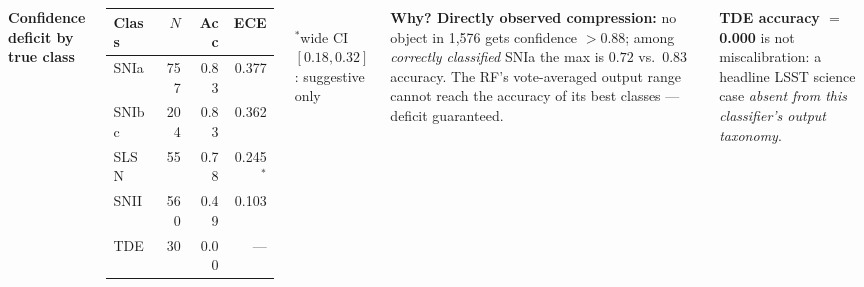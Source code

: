 \documentclass[20pt, a1paper, landscape, margin=0mm, innermargin=12mm, blockverticalspace=7mm, colspace=14mm, subcolspace=8mm]{tikzposter}
\begin{document}
\begin{columns}
{\vspace{4mm}
\begin{minipage}[t]{0.46\linewidth}
\centering
\textbf{Confidence deficit by true class}\\[2mm]
\begin{tabular}{lrrr}
\toprule
Class & $N$ & Acc & ECE \\
\midrule
SNIa  & 757 & 0.83 & \textcolor{posterbad}{0.377} \\
SNIbc & 204 & 0.83 & \textcolor{posterbad}{0.362} \\
SLSN  &  55 & 0.78 & 0.245$^{*}$ \\
SNII  & 560 & 0.49 & \textcolor{postergood}{0.103} \\
TDE   &  30 & \textcolor{posterbad}{0.00} & — \\
\bottomrule
\end{tabular}\\[2mm]
{\small $^{*}$wide CI $[0.18, 0.32]$: suggestive only}
\end{minipage}%
\hfill
\begin{minipage}[t]{0.50\linewidth}
\textbf{Why? Directly observed compression:} no object in 1,576 gets
confidence $>0.88$; among \emph{correctly classified} SNIa the max is
$0.72$ vs.\ $0.83$ accuracy. The RF's vote-averaged output range cannot
reach the accuracy of its best classes — deficit guaranteed.

\vspace{3mm}
\textbf{TDE accuracy $=$ 0.000} is not miscalibration: a headline LSST
science case \emph{absent from this classifier's output taxonomy}.
\end{minipage}
}



\end{columns}
\end{document}
